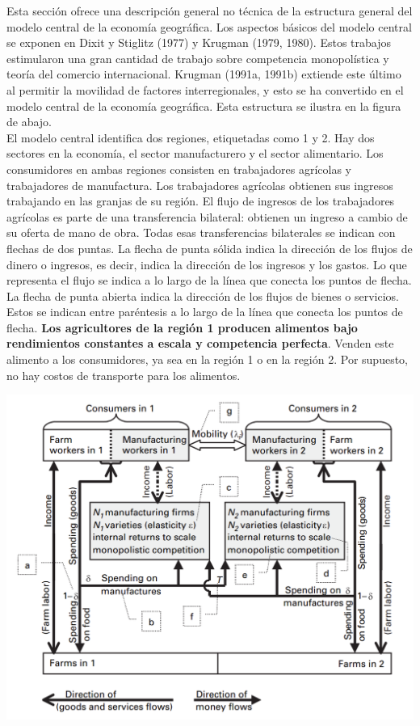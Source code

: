 Esta sección ofrece una descripción general no técnica de la estructura general del modelo central de la economía geográfica. Los aspectos básicos del modelo central se exponen en Dixit y Stiglitz (1977) y Krugman (1979, 1980). Estos trabajos estimularon una gran cantidad de trabajo sobre competencia monopolística y teoría del comercio internacional. Krugman (1991a, 1991b) extiende este último al permitir la movilidad de factores interregionales, y esto se ha convertido en el modelo central de la economía geográfica. Esta estructura se ilustra en la figura de abajo. \\
El modelo central identifica dos regiones, etiquetadas como 1 y 2. Hay dos sectores en la economía, el sector manufacturero y el sector alimentario. Los consumidores en ambas regiones consisten en trabajadores agrícolas y trabajadores de manufactura. Los trabajadores agrícolas obtienen sus ingresos trabajando en las granjas de su región. El flujo de ingresos de los trabajadores agrícolas es parte de una transferencia bilateral: obtienen un ingreso a cambio de su oferta de mano de obra. Todas esas transferencias bilaterales se indican con flechas de dos puntas. La flecha de punta sólida indica la dirección de los flujos de dinero o ingresos, es decir, indica la dirección de los ingresos y los gastos. Lo que representa el flujo se indica a lo largo de la línea que conecta los puntos de flecha. La flecha de punta abierta indica la dirección de los flujos de bienes o servicios. Estos se indican entre paréntesis a lo largo de la línea que conecta los puntos de flecha. \textbf{Los agricultores de la región 1 producen alimentos bajo rendimientos constantes a escala y competencia perfecta}. Venden este alimento a los consumidores, ya sea en la región 1 o en la región 2. Por supuesto, no hay costos de transporte para los alimentos.\\

\begin{center}
\includegraphics[scale=.3]{./imagen/diag.png}
\end{center}

